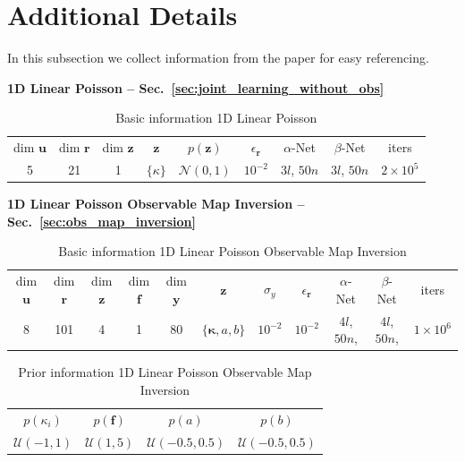 \documentclass[11pt, fleqn]{article}
\def\bkappa{{\boldsymbol \kappa}}
\def\y{{\mathbf y}}
\def\z{{\mathbf z}}
\def\fbf{{\mathbf f}}
\def\ubf{{\mathbf u}}
\def\r{{\mathbf r}}
\def\NPDF{{\mathcal N}}
\begin{document}
\section{Additional Details}\label{app:info_tables}

In this subsection we collect information from the paper for easy referencing.

\textbf{1D Linear Poisson -- Sec.~\ref{sec:joint_learning_without_obs}}


\begin{table}[H]
\centering
\begin{tabular}{*{9}{c} }
    \toprule 
    dim $\ubf$ & dim $\r$   & dim $\z$ & $\z$ & $p(\z)$ & $\epsilon_\r$ & $\alpha$-Net & $\beta$-Net & iters\\
    5 & 21 & 1  & $\{\kappa\}$ & $\NPDF(0, 1)$ & $10^{-2}$  & $3l$, $50n$ & $3l$, $50n$ &  $2\times 10^{5}$\\   
    \bottomrule
\end{tabular}
\caption{Basic information 1D Linear Poisson}
\end{table}

\textbf{ 1D Linear Poisson Observable Map Inversion -- Sec.~\ref{sec:obs_map_inversion} }


\begin{table}[H]
\centering
\begin{tabular}{*{11}{c} }
    \toprule 
    dim $\ubf$ & dim $\r$   & dim $\z$ & dim $\fbf$ &  dim $\y$ & $\z$ & $\sigma_y$  & $\epsilon_\r$ & $\alpha$-Net & $\beta$-Net & iters\\
    8 & 101 & 4 & 1 & 80 & $\{\bkappa, a, b\}$ & $10^{-2}$ & $10^{-2}$ & $4l$, $50n$, & $4l$, $50n$, &  $1\times 10^{6}$\\   
    \bottomrule
\end{tabular}
\caption{Basic information 1D Linear Poisson Observable Map Inversion}
\end{table}

\begin{table}[H]
\centering
\begin{tabular}{*{4}{c} }
    \toprule 
    $p(\kappa_i)$ & $p(\fbf)$ & $p(a)$ & $p(b)$\\
    $\mathcal{U}(-1, 1)$ & $\mathcal{U}(1,5)$ & $\mathcal{U}(-0.5, 0.5)$ & $\mathcal{U}(-0.5, 0.5)$\\   
    \bottomrule
\end{tabular}
\caption{Prior information  1D Linear Poisson Observable Map Inversion}
\end{table}
\end{document}
